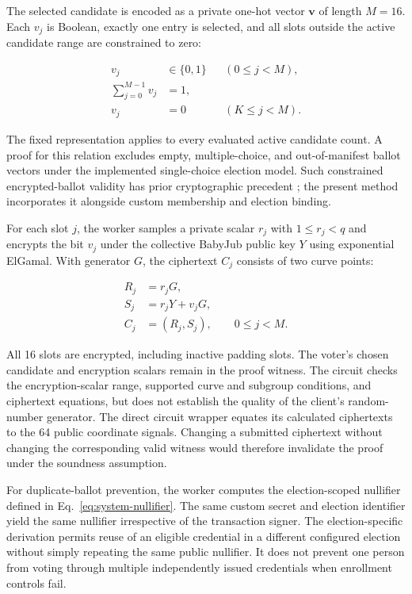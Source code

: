 The selected candidate is encoded as a private one-hot vector
$\mathbf{v}$ of length $M=16$. Each $v_j$ is Boolean, exactly one
entry is selected, and all slots outside the active candidate range are
constrained to zero:

\begin{equation}
\label{eq:protocol-onehot}
\begin{aligned}
 v_j&\in\{0,1\} && (0\leq j<M),\\
 \sum_{j=0}^{M-1}v_j&=1,\\
 v_j&=0 && (K\leq j<M).
\end{aligned}
\end{equation}

The fixed representation applies to every evaluated active candidate
count. A proof for this relation excludes empty, multiple-choice, and
out-of-manifest ballot vectors under the implemented single-choice
election model. Such constrained encrypted-ballot validity has prior
cryptographic precedent \citep{huber2025ballotvalidity}; the present
method incorporates it alongside custom membership and election
binding.

For each slot $j$, the worker samples a private scalar $r_j$ with
$1\leq r_j<q$ and encrypts the bit $v_j$ under the collective
BabyJub public key $Y$ using exponential ElGamal. With generator $G$,
the ciphertext $C_j$ consists of two curve points:

\begin{equation}
\label{eq:protocol-elgamal}
\begin{aligned}
 R_j &= r_jG,\\
 S_j &= r_jY+v_jG,\\
 C_j &= (R_j,S_j),\qquad 0\leq j<M.
\end{aligned}
\end{equation}

All 16 slots are encrypted, including inactive padding slots. The
voter's chosen candidate and encryption scalars remain in the proof
witness. The circuit checks the encryption-scalar range, supported
curve and subgroup conditions, and ciphertext equations, but does not
establish the quality of the client's random-number generator. The direct
circuit wrapper equates its calculated ciphertexts to the 64 public
coordinate signals. Changing a submitted ciphertext without changing
the corresponding valid witness would therefore invalidate the proof
under the soundness assumption.

For duplicate-ballot prevention, the worker computes the
election-scoped nullifier defined in
Eq.~\eqref{eq:system-nullifier}. The same custom secret and election
identifier yield the same nullifier irrespective of the transaction
signer. The election-specific derivation permits reuse of an eligible
credential in a different configured election without simply repeating
the same public nullifier. It does not prevent one person from voting
through multiple independently issued credentials when enrollment
controls fail.

